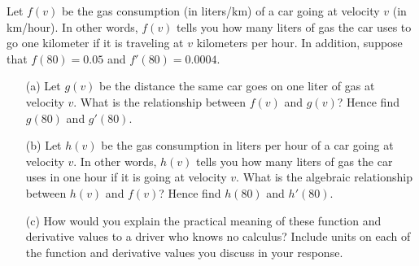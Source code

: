 \begin{lab}
Let $f(v)$ be the gas consumption (in liters/km) of a car going at velocity $v$ (in km/hour). In other words, $f(v)$ tells you how many liters of gas the car uses to go one kilometer if it is traveling at $v$ kilometers per hour. In addition, suppose that $f(80)=0.05$ and $f'(80) = 0.0004$.
\begin{enumerate}
    \item[(a)] Let $g(v)$ be the distance the same car goes on one liter of gas at velocity $v$.  What is the relationship between $f(v)$ and $g(v)$? Hence find $g(80)$ and $g'(80)$.
    \item[(b)] Let $h(v)$ be the gas consumption in liters per hour of a car going at velocity $v$. In other words, $h(v)$ tells you how many liters of gas the car uses in one hour if it is going at velocity $v$.   What is the algebraic relationship between $h(v)$ and $f(v)$?  Hence find $h(80)$ and $h'(80)$.     
    \item[(c)] How would you explain the practical meaning of these function and derivative values to a driver who knows no calculus?  Include units on each of the function and derivative values you discuss in your response.  
\end{enumerate}

\end{lab}

